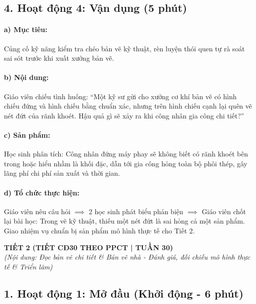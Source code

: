 \documentclass[12pt, a4paper]{article}
\begin{document}
\subsection*{4. Hoạt động 4: Vận dụng (5 phút)}

\paragraph{a) Mục tiêu:} Củng cố kỹ năng kiểm tra chéo bản vẽ kỹ thuật, rèn luyện thói quen tự rà soát sai sót trước khi xuất xưởng bản vẽ.

\paragraph{b) Nội dung:} Giáo viên chiếu tình huống: ``Một kỹ sư gửi cho xưởng cơ khí bản vẽ có hình chiếu đứng và hình chiếu bằng chuẩn xác, nhưng trên hình chiếu cạnh lại quên vẽ nét đứt của rãnh khoét. Hậu quả gì sẽ xảy ra khi công nhân gia công chi tiết?''

\paragraph{c) Sản phẩm:} Học sinh phân tích: Công nhân đứng máy phay sẽ không biết có rãnh khoét bên trong hoặc hiểu nhầm là khối đặc, dẫn tới gia công hỏng toàn bộ phôi thép, gây lãng phí chi phí sản xuất và thời gian.

\paragraph{d) Tổ chức thực hiện:} Giáo viên nêu câu hỏi $\implies$ 2 học sinh phát biểu phản biện $\implies$ Giáo viên chốt lại bài học: Trong vẽ kỹ thuật, thiếu một nét đứt là sai hỏng cả một sản phẩm. Giao nhiệm vụ chuẩn bị sản phẩm mô hình thực tế cho Tiết 2.

\newpage

\begin{center}
    \textbf{\large TIẾT 2 (TIẾT CĐ30 THEO PPCT | TUẦN 30)}\\[4pt]
    \textit{(Nội dung: Đọc bản vẽ chi tiết \& Bản vẽ nhà - Đánh giá, đối chiếu mô hình thực tế \& Triển lãm)}
\end{center}

\subsection*{1. Hoạt động 1: Mở đầu (Khởi động - 6 phút)}
\end{document}
